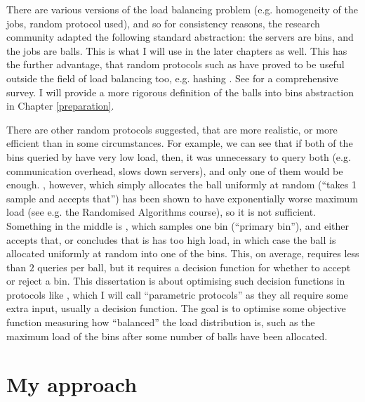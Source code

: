 There are various versions of the load balancing problem (e.g. homogeneity of the jobs, random protocol used), and so for consistency reasons, the research community adapted the following standard abstraction: the servers are bins, and the jobs are balls. This is what I will use in the later chapters as well. This has the further advantage, that random protocols such as \TwoChoice have proved to be useful outside the field of load balancing too, e.g. hashing \cite{azar1999twochoice}. See \cite{udi2017ballsintobinslandscape} for a comprehensive survey. I will provide a more rigorous definition of the balls into bins abstraction in Chapter \ref{preparation}.


There are other random protocols suggested, that are more realistic, or more efficient than \TwoChoice in some circumstances. For example, we can see that if both of the bins queried by \TwoChoice have very low load, then, it was unnecessary to query both (e.g. communication overhead, slows down servers), and only one of them would be enough. \OneChoice, however, which simply allocates the ball uniformly at random (``takes 1 sample and accepts that'') has been shown to have exponentially worse maximum load (see e.g. the Randomised Algorithms course), so it is not sufficient. Something in the middle is \TwoThinning \cite{feldheim2021thinning}, which samples one bin (``primary bin''), and either accepts that, or concludes that is has too high load, in which case the ball is allocated uniformly at random into one of the bins. This, on average, requires less than $2$ queries per ball, but it requires a decision function for whether to accept or reject a bin. This dissertation is about optimising such decision functions in protocols like \TwoThinning, which I will call ``parametric protocols'' as they all require some extra input, usually a decision function. The goal is to optimise some objective function measuring how ``balanced'' the load distribution is, such as the maximum load of the bins after some number of balls have been allocated.



\section{My approach}

